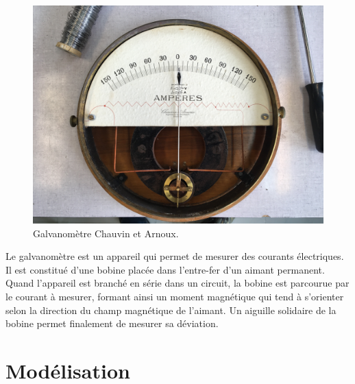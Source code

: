 \documentclass[12pt,a4paper,fleqn]{article}
\begin{document}
\begin{figure}[h]
\center
\includegraphics[scale=0.1]{galvanometre.jpg}
\caption{Galvanomètre Chauvin et Arnoux.}
\end{figure}

Le galvanomètre est un appareil qui permet de mesurer des courants électriques.
Il est constitué d'une bobine placée dans l'entre-fer d'un aimant permanent.
Quand l'appareil est branché en série dans un circuit, la bobine est parcourue par le courant à mesurer, formant ainsi un moment magnétique qui tend à s'orienter selon la direction du champ magnétique de l'aimant.
Un aiguille solidaire de la bobine permet finalement de mesurer sa déviation.

\section{Modélisation}
\end{document}
